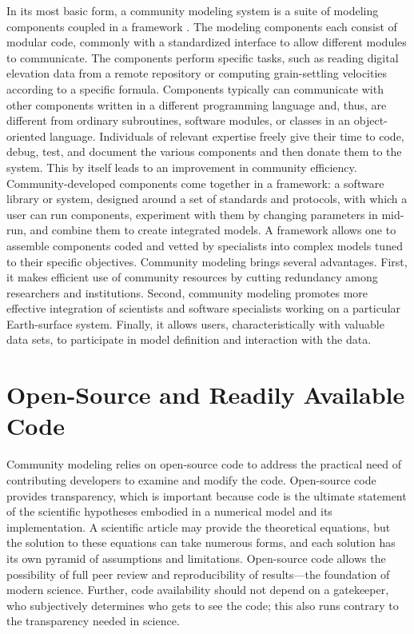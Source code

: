 \documentclass[10pt,twocolumn,preprint]{elsarticle}
\begin{document}
In its most basic form, a community modeling system is a suite of modeling components coupled in a framework \citep{voinov2010community}. The modeling components each consist of modular code, commonly with a standardized interface to allow different modules to communicate. The components perform specific tasks, such as reading digital elevation data from a remote repository or computing grain-settling velocities according to a specific formula. Components typically can communicate with other components written in a different programming language and, thus, are different from ordinary subroutines, software modules, or classes in an object-oriented language. Individuals of relevant expertise freely give their time to code, debug, test, and document the various components and then donate them to the system. This by itself leads to an improvement in community efficiency. Community-developed components come together in a framework: a software library or system, designed around a set of standards and protocols, with which a user can run components, experiment with them by changing parameters in mid-run, and combine them to create integrated models. A framework allows one to assemble components coded and vetted by specialists into complex models tuned to their specific objectives. Community modeling brings several advantages. First, it makes efficient use of community resources by cutting redundancy among researchers and institutions. Second, community modeling promotes more effective integration of scientists and software specialists working on a particular Earth-surface system. Finally, it allows users, characteristically with valuable data sets, to participate in model definition and interaction with the data.



\section{Open-Source and Readily Available Code}

Community modeling relies on open-source code to address the practical need of contributing developers to examine and modify the code. Open-source code provides transparency, which is important because code is the ultimate statement of the scientific hypotheses embodied in a numerical model and its implementation. A scientific article may provide the theoretical equations, but the solution to these equations can take numerous forms, and each solution has its own pyramid of assumptions and limitations. Open-source code allows the possibility of full peer review and reproducibility of results---the foundation of modern science. Further, code availability should not depend on a gatekeeper, who subjectively determines who gets to see the code; this also runs contrary to the transparency needed in science.
\end{document}
